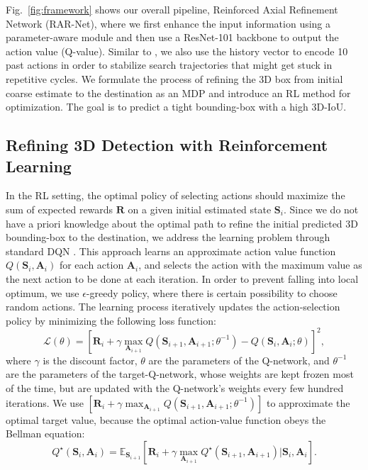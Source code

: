 \documentclass[runningheads]{llncs}
\begin{document}
Fig.~\ref{fig:framework} shows our overall pipeline, Reinforced Axial Refinement Network (RAR-Net), where we first enhance the input information using a parameter-aware module and then use a ResNet-101 \cite{he2016deep} backbone to output the action value (Q-value). Similar to \cite{caicedo2015active}, we also use the history vector to encode 10 past actions in order to stabilize search trajectories that might get stuck in repetitive cycles. We formulate the process of refining the 3D box from initial coarse estimate to the destination as an MDP and introduce an RL method for optimization. The goal is to predict a tight bounding-box with a high 3D-IoU.

\subsection{Refining 3D Detection with Reinforcement Learning}

In the RL setting, the optimal policy of selecting actions should maximize the sum of expected rewards $\mathbf{R}$ on a given initial estimated state $\mathbf{S}_i$. Since we do not have a priori knowledge about the optimal path to refine the initial predicted 3D bounding-box to the destination, we address the learning problem through standard DQN \cite{mnih2015human}. This approach learns an approximate action value function $Q(\mathbf{S}_i, \mathbf{A}_i)$ for each action $\mathbf{A}_i$, and selects the action with the maximum value as the next action to be done at each iteration. In order to prevent falling into local optimum, we use $\epsilon$-greedy policy, where there is certain possibility to choose random actions. The learning process iteratively updates the action-selection policy by minimizing the following loss function:
\begin{equation}
\mathcal{L}(\theta) =  [ \mathbf{R}_i + \gamma \max_{\mathbf{A}_{i+1}}Q(\mathbf{S}_{i+1}, \mathbf{A}_{i+1};\theta^{-1}) -Q(\mathbf{S}_i, \mathbf{A}_i;\theta)  ]^2,
\end{equation}
where $\gamma$ is the discount factor, $\theta$ are the parameters of the Q-network, and $\theta^{-1}$ are the parameters of the target-Q-network, whose weights are kept frozen most of the time, but are updated with the Q-network's weights every few hundred iterations. We use $[\mathbf{R}_i + \gamma \max_{\mathbf{A}_{i+1}}Q(\mathbf{S}_{i+1}, \mathbf{A}_{i+1};\theta^{-1})]$ to approximate the optimal target value, because the optimal action-value function obeys the Bellman equation:
\begin{equation}
Q^{\star}(\mathbf{S}_i, \mathbf{A}_i) =  \mathbb{E}_{\mathbf{S}_{i+1}}[ \mathbf{R}_i + \gamma \max_{\mathbf{A}_{i+1}}Q^{\star}(\mathbf{S}_{i+1}, \mathbf{A}_{i+1})|\mathbf{S}_i, \mathbf{A}_i].
\end{equation}
\end{document}
